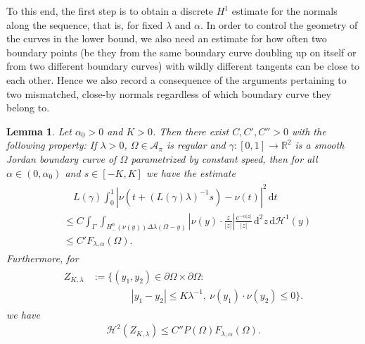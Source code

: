\documentclass[11pt]{article}
\newcounter{statement}
\numberwithin{statement}{section}
\numberwithin{equation}{section}
\newtheorem{lemma}[statement]{Lemma}
\theoremstyle{remark}
\newcommand{\R}{\mathbb R} 				%
\newcommand{\intd}{\, \mathrm{d}} 				%
\newcommand{\Hd}{\mathcal H}				%
\begin{document}
To this end, the first step is to obtain a discrete $H^1$ estimate for
the normals along the sequence, that is, for fixed $\lambda$ and
$\alpha$.  In order to control the geometry of the curves in the lower
bound, we also need an estimate for how often two boundary points (be
they from the same boundary curve doubling up on itself or from two
different boundary curves) with wildly different tangents can be close
to each other. Hence we also record a consequence of the arguments
pertaining to two mismatched, close-by normals regardless of
which boundary curve they belong to.
        
        \begin{lemma}\label{lemma:discrete}
          Let $\alpha_0 > 0$ and $K > 0$. Then there exist
          $C, C', C'' > 0$ with the following property:
          If $\lambda > 0$, $\Omega \in \mathcal{A}_\pi$ is regular
          and $\gamma :[0,1] \to \R^2$ is a smooth Jordan boundary
          curve of $\Omega$ parametrized by constant speed, then for
          all $\alpha \in (0, \alpha_0)$ and $s \in [-K,K]$ we have
          the estimate
	  \begin{align}\label{eq:norms_boundedness}
	  \begin{split}
            & \quad L(\gamma) \int_0^1 \left|\nu \left(t+ (L(\gamma)
                \lambda)^{-1} s \right)- \nu(t)\right|^2
            \intd t \\
            & \leq C \int_{\Gamma} \int_{ H^0_- (\nu(y)) \Delta
              \lambda(\Omega - y) } \left| \nu(y) \cdot \frac{ z}{|z|}
            \right| \frac{e^{-\alpha |z|}}{|z|} \intd^2 z
            \intd \Hd^1(y) \\
            & \leq C' F_{\lambda,\alpha}(\Omega).
	  \end{split}
          \end{align}
          Furthermore, for
	\begin{align}
	  \begin{split}
            Z_{K,\lambda} & := \big\{ (y_1,y_2) \in \partial \Omega
            \times \partial
            \Omega : \\
            & \qquad \qquad|y_1-y_2| \leq K \lambda^{-1}, \
            \nu(y_1)\cdot \nu (y_2) \leq 0 \big\}.
	  \end{split}
	\end{align}
	we have
	\begin{align}\label{eq:weak_estimate}
          \mathcal{H}^2(Z_{K,\lambda})  \leq  C ''
          P(\Omega)F_{\lambda,\alpha}(\Omega).
	\end{align}
\end{lemma}
\end{document}
